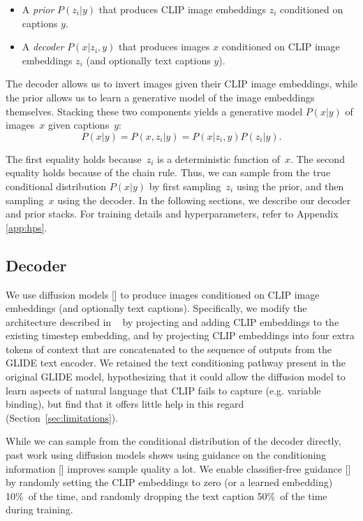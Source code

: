 \begin{itemize}
    \item A \textit{prior} $P(z_i|y)$ that produces CLIP image embeddings $z_i$ conditioned on captions $y$.
    \item A \textit{decoder} $P(x|z_i,y)$ that produces images $x$ conditioned on CLIP image embeddings $z_i$ (and optionally text captions $y$). 
\end{itemize}

The decoder allows us to invert images given their CLIP image embeddings, while the prior allows us to learn a generative model of the image embeddings themselves. Stacking these two components yields a generative model $P(x|y)$ of images~$x$ given captions~$y$: $$P(x|y) = P(x,z_i|y) = P(x|z_i,y) P(z_i|y).$$

The first equality holds because~$z_i$ is a deterministic function of~$x$. The second equality holds because of the chain rule. Thus, we can sample from the true conditional distribution $P(x|y)$ by first sampling~$z_i$ using the prior, and then sampling~$x$ using the decoder. In the following sections, we describe our decoder and prior stacks. For training details and hyperparameters, refer to Appendix \ref{app:hps}.

\subsection{Decoder}
We use diffusion models [] to produce images conditioned on CLIP image embeddings (and optionally text captions). Specifically, we modify the architecture described in ~\cite{glide} by projecting and adding CLIP embeddings to the existing timestep embedding, and by projecting CLIP embeddings into four extra tokens of context that are concatenated to the sequence of outputs from the GLIDE text encoder. We retained the text conditioning pathway present in the original GLIDE model, hypothesizing that it could allow the diffusion model to learn aspects of natural language that CLIP fails to capture (e.g. variable binding), but find that it offers little help in this regard (Section~\ref{sec:limitations}). 

While we can sample from the conditional distribution of the decoder directly, past work using diffusion models shows using guidance on the conditioning information [] improves sample quality a lot. We enable classifier-free guidance [] by randomly setting the CLIP embeddings to zero (or a learned embedding) 10\%~of the time, and randomly dropping the text caption 50\%~of the time during training. 

